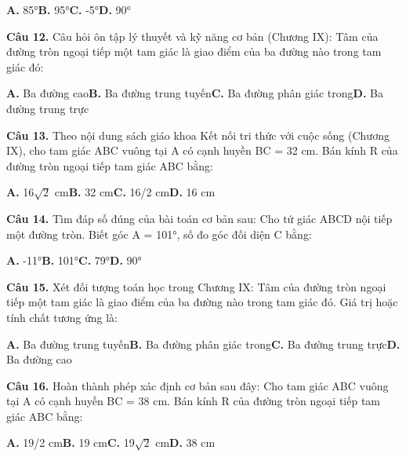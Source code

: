 \documentclass[11pt,a4paper]{article}
\begin{document}
\hspace*{1.5em}\textbf{A.} 85°\quad\quad \textbf{B.} 95°\quad\quad \textbf{C.} -5°\quad\quad \textbf{D.} 90°\par\vspace{2pt}
\textbf{\color{primary} Câu 12.} Câu hỏi ôn tập lý thuyết và kỹ năng cơ bản (Chương IX): Tâm của đường tròn ngoại tiếp một tam giác là giao điểm của ba đường nào trong tam giác đó:\par
\hspace*{1.5em}\textbf{A.} Ba đường cao\quad\quad \textbf{B.} Ba đường trung tuyến\quad\quad \textbf{C.} Ba đường phân giác trong\quad\quad \textbf{D.} Ba đường trung trực\par\vspace{2pt}
\textbf{\color{primary} Câu 13.} Theo nội dung sách giáo khoa Kết nối tri thức với cuộc sống (Chương IX), cho tam giác ABC vuông tại A có cạnh huyền BC = 32 cm. Bán kính R của đường tròn ngoại tiếp tam giác ABC bằng:\par
\hspace*{1.5em}\textbf{A.} 16$\sqrt{2}$ cm\quad\quad \textbf{B.} 32 cm\quad\quad \textbf{C.} 16/2 cm\quad\quad \textbf{D.} 16 cm\par\vspace{2pt}
\textbf{\color{primary} Câu 14.} Tìm đáp số đúng của bài toán cơ bản sau: Cho tứ giác ABCD nội tiếp một đường tròn. Biết góc A = 101°, số đo góc đối diện C bằng:\par
\hspace*{1.5em}\textbf{A.} -11°\quad\quad \textbf{B.} 101°\quad\quad \textbf{C.} 79°\quad\quad \textbf{D.} 90°\par\vspace{2pt}
\textbf{\color{primary} Câu 15.} Xét đối tượng toán học trong Chương IX: Tâm của đường tròn ngoại tiếp một tam giác là giao điểm của ba đường nào trong tam giác đó. Giá trị hoặc tính chất tương ứng là:\par
\hspace*{1.5em}\textbf{A.} Ba đường trung tuyến\quad\quad \textbf{B.} Ba đường phân giác trong\quad\quad \textbf{C.} Ba đường trung trực\quad\quad \textbf{D.} Ba đường cao\par\vspace{2pt}
\textbf{\color{primary} Câu 16.} Hoàn thành phép xác định cơ bản sau đây: Cho tam giác ABC vuông tại A có cạnh huyền BC = 38 cm. Bán kính R của đường tròn ngoại tiếp tam giác ABC bằng:\par
\hspace*{1.5em}\textbf{A.} 19/2 cm\quad\quad \textbf{B.} 19 cm\quad\quad \textbf{C.} 19$\sqrt{2}$ cm\quad\quad \textbf{D.} 38 cm\par\vspace{2pt}
\end{document}
